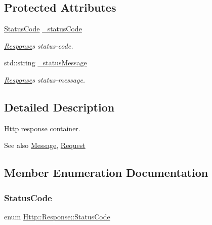 \subsection*{Protected Attributes}
\begin{DoxyCompactItemize}
\item 
\mbox{\label{classHttp_1_1Response_ad928afe87b6e75096ad340280c0dcf98}} 
\mbox{\hyperlink{classHttp_1_1Response_a5761160e095c8bbecf2ed847efa1f6dd}{Status\+Code}} \mbox{\hyperlink{classHttp_1_1Response_ad928afe87b6e75096ad340280c0dcf98}{\+\_\+status\+Code}}
\begin{DoxyCompactList}\small\item\em \mbox{\hyperlink{classHttp_1_1Response}{Response}}\textquotesingle{}s status-\/code. \end{DoxyCompactList}\item 
\mbox{\label{classHttp_1_1Response_a242dd229765ff7bb27ffd2a92e056c1d}} 
std\+::string \mbox{\hyperlink{classHttp_1_1Response_a242dd229765ff7bb27ffd2a92e056c1d}{\+\_\+status\+Message}}
\begin{DoxyCompactList}\small\item\em \mbox{\hyperlink{classHttp_1_1Response}{Response}}\textquotesingle{}s status-\/message. \end{DoxyCompactList}\end{DoxyCompactItemize}


\subsection{Detailed Description}
Http response container. 

\begin{DoxySeeAlso}{See also}
\mbox{\hyperlink{classHttp_1_1Message}{Message}}, \mbox{\hyperlink{classHttp_1_1Request}{Request}} 
\end{DoxySeeAlso}


\subsection{Member Enumeration Documentation}
\mbox{\label{classHttp_1_1Response_a5761160e095c8bbecf2ed847efa1f6dd}} 
\subsubsection{\texorpdfstring{StatusCode}{StatusCode}}
{\footnotesize\ttfamily enum \mbox{\hyperlink{classHttp_1_1Response_a5761160e095c8bbecf2ed847efa1f6dd}{Http\+::\+Response\+::\+Status\+Code}}\hspace{0.3cm}{\ttfamily [strong]}}

